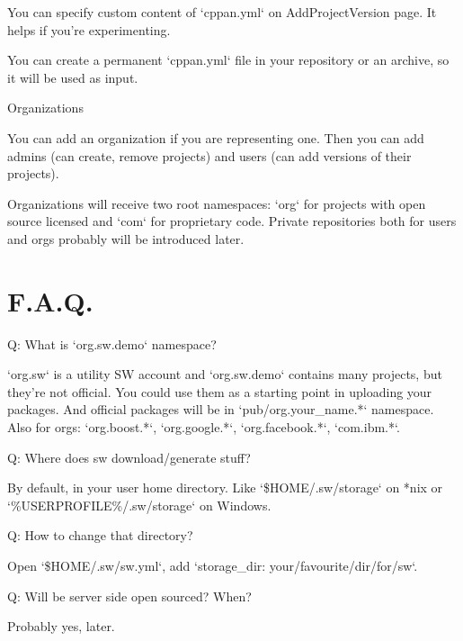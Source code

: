 You can specify custom content of `cppan.yml` on AddProjectVersion page. It helps if you're experimenting.

You can create a permanent `cppan.yml` file in your repository or an archive, so it will be used as input.

Organizations

You can add an organization if you are representing one. Then you can add admins (can create, remove projects) and users (can  add versions of their projects).

Organizations will receive two root namespaces: `org` for projects with open source licensed and `com` for proprietary code. Private repositories both for users and orgs probably will be introduced later.










\chapter*{F.A.Q.}


Q: What is `org.sw.demo` namespace?

`org.sw` is a utility SW account and `org.sw.demo` contains many projects, but they're not official. You could use them as a starting point in uploading your packages. And official packages will be in `pub/org.your_name.*` namespace. Also for orgs: `org.boost.*`, `org.google.*`, `org.facebook.*`, `com.ibm.*`.

Q: Where does sw download/generate stuff?

By default, in your user home directory. Like `\$HOME/.sw/storage` on *nix or `\%USERPROFILE\%/.sw/storage` on Windows.

Q: How to change that directory?

Open `\$HOME/.sw/sw.yml`, add `storage_dir: your/favourite/dir/for/sw`.

Q: Will be server side open sourced? When?

Probably yes, later.
